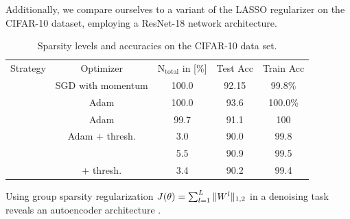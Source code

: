 \begin{minipage}[t]{\textwidth}
\begin{minipage}[b][\bottomstripheight][b]{.48\textwidth}
\begin{figure}
\begin{minipage}{.3\textwidth}
\end{minipage}%
\end{figure}%
%
%
%
\vfill%
Additionally, we compare ourselves to a variant of the LASSO \cite{tibshirani1996regression} regularizer on the CIFAR-10 dataset, employing a ResNet-18 network architecture.
%
%
%
\begin{table}[htb]
\scriptsize
\begin{minipage}{.69\textwidth}%
\begin{tabularx}{\textwidth}{|c||c c|C C|}
Strategy & Optimizer & 
$\mathrm{N}_{\mathrm{total}}$ in [\%] & 
Test Acc&Train Acc\\
\hhline{|=====|}
&SGD with momentum &100.0&92.15&99.8\%\\
&Adam &100.0&93.6&100.0\%\\
\hhline{-----}
        &Adam &99.7&91.1 &100\\
        &Adam + thresh.&3.0&90.0 &99.8\\
\hhline{-----}
                &\LinBreg{} &5.5&90.9&99.5\\
                &\LinBreg{} + thresh.&3.4&90.2&99.4\\
\end{tabularx}
\end{minipage}%
\begin{minipage}{.01\textwidth}%
\phantom{2}
\end{minipage}%
%
\begin{minipage}{.3\textwidth}%
\caption{\small Sparsity levels and accuracies on the CIFAR-10 data set.}\label{tab:CIFAR}
\end{minipage}
\end{table}
%
%
%
%
%
%
\end{minipage}%
%
\hfill%
%
%
%
\hfill%
%
%
%
%
%
%
%
\noindent\begin{minipage}[b][\bottomstripheight][b]{.48\textwidth}%
%
%
\small%
Using group sparsity regularization $J(\theta) = \sum_{l=1}^L\Vert W^l\Vert_{1,2}$ in a denoising task reveals an autoencoder architecture
\cite{bungert21}.


\end{minipage}
\end{minipage}
